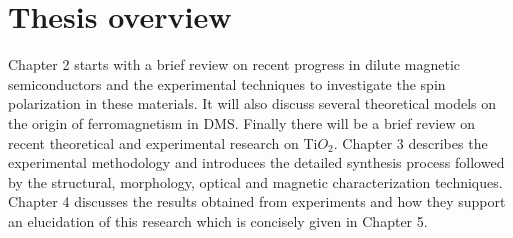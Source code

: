 \documentclass[main.tex]{subfiles}
\begin{document}
\section{Thesis overview}

Chapter 2 starts with a brief review on recent progress in dilute magnetic semiconductors and the experimental techniques to investigate the spin polarization in these materials. It will also discuss several theoretical models on the origin of ferromagnetism in DMS. Finally there will be a brief review on recent theoretical and experimental research on Ti$O_{2}$. Chapter 3 describes the experimental methodology and introduces the detailed synthesis process followed by the structural, morphology, optical and magnetic characterization techniques. Chapter 4 discusses the results obtained from experiments and how they support an elucidation of this research which is concisely given in Chapter 5.      

\thispagestyle{fancy}
\end{document}
